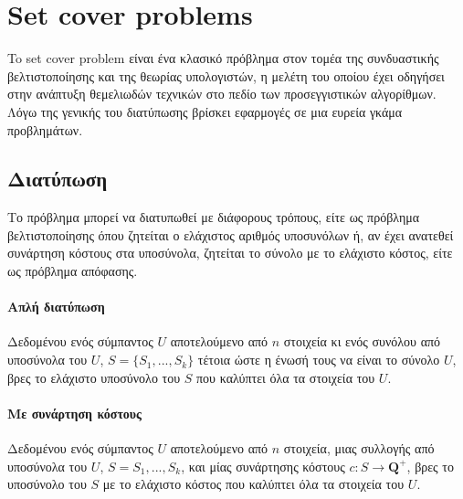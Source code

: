 
\chapter{Set cover problems} %

\label{Chapter1} %

To set cover problem είναι ένα κλασικό πρόβλημα στον τομέα της συνδυαστικής βελτιστοποίησης και της θεωρίας υπολογιστών, η μελέτη του οποίου έχει οδηγήσει στην ανάπτυξη θεμελιωδών τεχνικών στο πεδίο των προσεγγιστικών αλγορίθμων. Λόγω της γενικής του διατύπωσης βρίσκει εφαρμογές σε μια ευρεία γκάμα προβλημάτων.

\section{Διατύπωση}
Το πρόβλημα μπορεί να διατυπωθεί με διάφορους τρόπους, είτε ως πρόβλημα βελτιστοποίησης όπου ζητείται ο ελάχιστος αριθμός υποσυνόλων ή, αν έχει ανατεθεί συνάρτηση κόστους στα υποσύνολα, ζητείται το σύνολο με το ελάχιστο κόστος, είτε ως πρόβλημα απόφασης. 


\subsubsection{Απλή διατύπωση}
Δεδομένου ενός σύμπαντος $U$ αποτελούμενο από $n$ στοιχεία κι ενός συνόλου από υποσύνολα του $U$, $S = \{S_1,...,S_k\}$ τέτοια ώστε η ένωσή τους να είναι το σύνολο $U$, βρες το ελάχιστο υποσύνολο του $S$ που καλύπτει όλα τα στοιχεία του $U$.

\subsubsection{Με συνάρτηση κόστους}
Δεδομένου ενός σύμπαντος $U$ αποτελούμενο από $n$ στοιχεία, μιας συλλογής από υποσύνολα του $U$, $S = {S_1,...,S_k}$, και μίας συνάρτησης κόστους $c : S \rightarrow {\boldsymbol{Q}^+}$, βρες το υποσύνολο του $S$ με το ελάχιστο κόστος που καλύπτει όλα τα στοιχεία του $U$.

